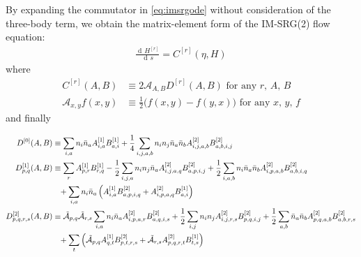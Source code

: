 \documentclass[amsmath, amssymb, aps, floatfix, nofootinbib, preprintnumbers,showpacs, superscriptaddress, twocolumn]{revtex4-1}
\newcommand{\D}{\operatorname{d\!}}
\begin{document}
By expanding the commutator in \eqref{eq:imsrgode} without consideration of the three-body term, we obtain the matrix-element form of the IM-SRG(2) flow equation:
\begin{align}
    \frac{\D H^{[r]}}{\D s} = C^{[r]}(\eta, H) \label{eq:flowmxe}
\end{align}
where
\begin{align}
  C^{[r]}(A, B) &\equiv 2 \mathcal{A}_{A, B} D^{[r]}(A, B) \text{ for any $r$, $A$, $B$} \label{eq:commutmxe} \\
  \mathcal{A}_{x, y} f(x, y) &\equiv \frac{1}{2} \bigl(f(x, y) - f(y, x)\bigr) \text{ for any $x$, $y$, $f$}
\end{align}
and finally
\begin{widetext}
  \begin{align}
    D^{[0]}(A, B)
    &\equiv
      \sum_{i, a} n_i \bar{n}_a A^{[1]}_{i, a} B^{[1]}_{a, i}
      + \frac{1}{4} \sum_{i, j, a, b} n_i n_j \bar{n}_a \bar{n}_b A^{[2]}_{i, j, a, b} B^{[2]}_{a, b, i, j}
      \label{eq:flow0} \\
    D^{[1]}_{p, q}(A, B)
    &\equiv
      \sum_{r} A^{[1]}_{p, r} B^{[1]}_{r, q}
      - \frac{1}{2} \sum_{i, j, a} n_i n_j \bar{n}_a A^{[2]}_{i, j, a, q} B^{[2]}_{a, p, i, j}
      + \frac{1}{2} \sum_{i, a, b} n_i \bar{n}_a \bar{n}_b A^{[2]}_{i, p, a, b} B^{[2]}_{a, b, i, q}
      \notag \\
    &\hphantom{=}
      + \sum_{i, a} n_i \bar{n}_a \left(
        A^{[1]}_{i, a} B^{[2]}_{a, p, i, q}
        + A^{[2]}_{i, p, a, q} B^{[1]}_{a, i}
      \right)
      \label{eq:flow1} \\
    D^{[2]}_{p, q, r, s}(A, B)
    &\equiv
      \tilde{\mathcal{A}}_{p, q} \tilde{\mathcal{A}}_{r, s}
        \sum_{i, a} n_i \bar{n}_a A^{[2]}_{i, p, a, r} B^{[2]}_{a, q, i, s}
      + \frac{1}{2} \sum_{i, j} n_i n_j A^{[2]}_{i, j, r, s} B^{[2]}_{p, q, i, j}
      + \frac{1}{2} \sum_{a, b} \bar{n}_a \bar{n}_b A^{[2]}_{p, q, a, b} B^{[2]}_{a, b, r, s}
      \notag \\
    &\hphantom{=}
      + \sum_{t} \left(
        \tilde{\mathcal{A}}_{p, q} A^{[1]}_{q, t} B^{[2]}_{p, t, r, s}
        + \tilde{\mathcal{A}}_{r, s} A^{[2]}_{p, q, r, t} B^{[1]}_{t, s}
      \right)
      \label{eq:flow2}
\end{align}
\end{widetext}
\end{document}

